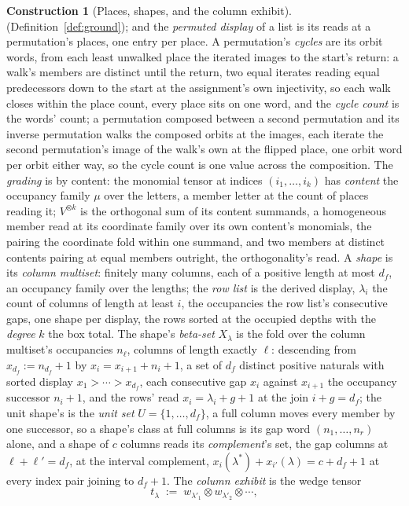 \documentclass[11pt]{article}
\theoremstyle{definition}
\newtheorem{construction}{Construction}
\begin{document}
\begin{construction}[Places, shapes, and the column exhibit]
(Definition~\ref{def:ground}); and the \emph{permuted display}
of a list is its reads at a permutation's places, one entry per
place. A
permutation's \emph{cycles} are its orbit words, from
each least unwalked place the iterated images to the start's
return: a walk's members are distinct until the return, two equal
iterates reading equal predecessors down to the start at the
assignment's own injectivity, so each walk closes within the place
count, every place sits on one word, and the \emph{cycle count} is
the words' count; a permutation composed between a second
permutation and its inverse permutation walks the composed orbits
at the images, each iterate the second permutation's image of the
walk's own at the flipped place, one orbit word per orbit either
way, so the cycle count is one value across the composition. The
\emph{grading} is by content: the monomial tensor at indices
$(i_1,\dots,i_k)$ has \emph{content} the occupancy family $\mu$
over the letters, a member letter at the count of places
reading it; $V^{\otimes k}$ is the orthogonal
sum of its content summands, a homogeneous member read at its
coordinate family over its own content's monomials, the pairing
the coordinate fold within one summand, and two members at
distinct contents pairing at equal members outright, the
orthogonality's read. A \emph{shape} is its \emph{column
multiset}: finitely many columns, each of a positive length at
most $d_f$, an occupancy family over the lengths; the \emph{row
list} is the derived display, $\lambda_i$ the count of columns of
length at least $i$, the occupancies the row list's consecutive
gaps, one shape per display, the rows sorted at the occupied
depths with the \emph{degree} $k$ the box total. The shape's \emph{beta-set}
$X_\lambda$ is the fold over the column multiset's occupancies
$n_\ell$, columns of length exactly $\ell$: descending from
$x_{d_f}:=n_{d_f}+1$ by $x_i=x_{i+1}+n_i+1$, a set of $d_f$
distinct positive naturals with sorted display
$x_1>\cdots>x_{d_f}$, each consecutive gap $x_i$ against $x_{i+1}$
the occupancy successor $n_i+1$, and the rows' read
$x_i=\lambda_i+g+1$ at the join $i+g=d_f$; the unit shape's is the \emph{unit set}
$U=\{1,\dots,d_f\}$, a full column moves every member by one
successor, so a shape's class at full columns is its gap word
$(n_1,\dots,n_r)$ alone,
and a shape of $c$ columns reads its \emph{complement}'s set, the
gap columns at $\ell+\ell'=d_f$, at the interval complement,
$x_i(\lambda^*)+x_{i'}(\lambda)=c+d_f+1$ at every index pair
joining to $d_f+1$.
The \emph{column exhibit}
is the wedge tensor
\[
t_\lambda\;:=\;w_{\lambda'_1}\otimes w_{\lambda'_2}\otimes\cdots ,
\]
\end{construction}
\end{document}
